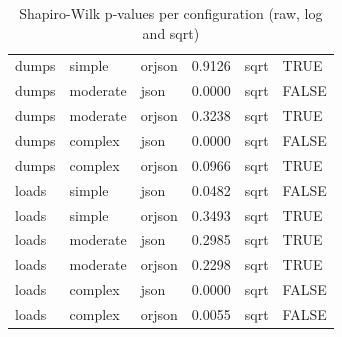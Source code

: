 \begin{table}[ht]
\begin{tabular}{lllrll}
  dumps & simple & orjson & 0.9126 & sqrt & TRUE \\ 
  dumps & moderate & json & 0.0000 & sqrt & FALSE \\ 
  dumps & moderate & orjson & 0.3238 & sqrt & TRUE \\ 
  dumps & complex & json & 0.0000 & sqrt & FALSE \\ 
  dumps & complex & orjson & 0.0966 & sqrt & TRUE \\ 
  loads & simple & json & 0.0482 & sqrt & FALSE \\ 
  loads & simple & orjson & 0.3493 & sqrt & TRUE \\ 
  loads & moderate & json & 0.2985 & sqrt & TRUE \\ 
  loads & moderate & orjson & 0.2298 & sqrt & TRUE \\ 
  loads & complex & json & 0.0000 & sqrt & FALSE \\ 
  loads & complex & orjson & 0.0055 & sqrt & FALSE \\ 
   \bottomrule
\end{tabular}
\caption{Shapiro-Wilk p-values per configuration (raw, log and sqrt)} 
\label{tab:normality}
\end{table}
